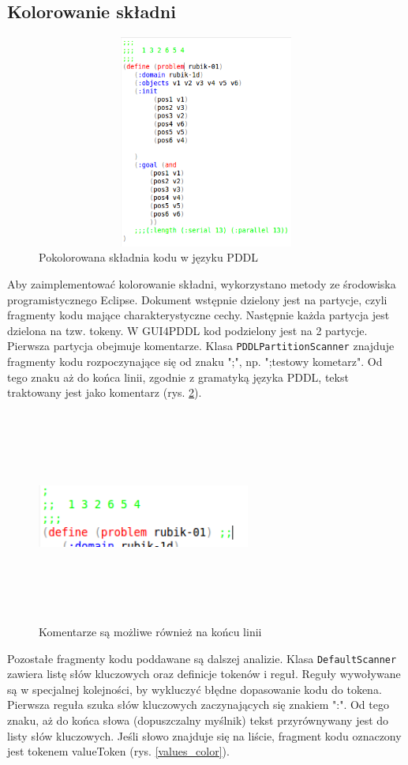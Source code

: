 \subsection{Kolorowanie składni}
\begin{figure}[h]
  \centering
    \includegraphics[width=13cm,height=7cm,keepaspectratio]{img/colored-code.png}
    \caption{Pokolorowana składnia kodu w języku PDDL}
    \label{colored-code}
\end{figure}
Aby zaimplementować kolorowanie składni, wykorzystano metody ze środowiska programistycznego Eclipse. Dokument wstępnie dzielony jest na partycje, czyli fragmenty kodu mające charakterystyczne cechy. Następnie każda partycja jest dzielona na tzw. tokeny. W GUI4PDDL kod podzielony jest na 2 partycje. Pierwsza partycja obejmuje komentarze. Klasa \texttt{PDDLPartitionScanner} znajduje fragmenty kodu rozpoczynające się od znaku ";", np.  ";testowy kometarz". Od tego znaku aż do końca linii, zgodnie z gramatyką języka PDDL, tekst traktowany jest jako komentarz (rys. \ref{comments}).
\begin{figure}[h]
  \centering
    \includegraphics[width=7cm,height=7cm,keepaspectratio]{img/comments.png}
    \caption{Komentarze są możliwe również na końcu linii}
    \label{comments}
\end{figure}
Pozostałe fragmenty kodu poddawane są dalszej analizie. Klasa \texttt{DefaultScanner} zawiera listę słów kluczowych oraz definicje tokenów i reguł. Reguły wywoływane są w specjalnej kolejności, by wykluczyć błędne dopasowanie kodu do tokena. Pierwsza reguła szuka słów kluczowych zaczynających się znakiem ":".  Od tego znaku, aż do końca słowa (dopuszczalny myślnik) tekst przyrównywany jest do listy słów kluczowych. Jeśli słowo znajduje się na liście, fragment kodu oznaczony jest tokenem valueToken (rys. \ref{values_color}).

